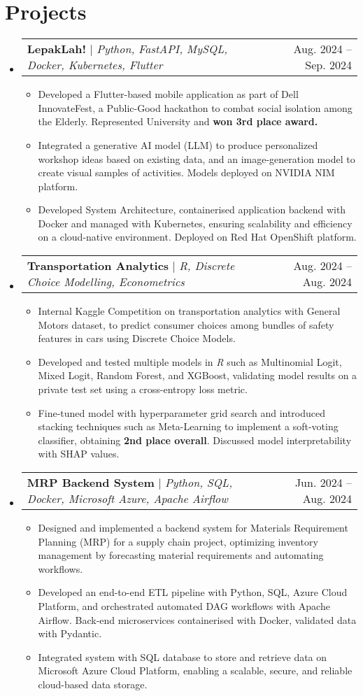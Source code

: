 \documentclass[letterpaper,11pt]{article}
\makeatletter
\newcommand{\resumeItem}[1]{
  \item\small{
    {#1 \vspace{-2pt}}
  }
}
\newcommand{\resumeProjectHeading}[2]{
    \item
    \begin{tabular*}{1.001\textwidth}{l@{\extracolsep{\fill}}r}
      \small#1 & \small #2\\
    \end{tabular*}\vspace{-7pt}
}
\newcommand{\resumeSubHeadingListStart}{\begin{itemize}[leftmargin=0.0in, label={}]}
\newcommand{\resumeSubHeadingListEnd}{\end{itemize}}
\newcommand{\resumeItemListStart}{\begin{itemize}}
\newcommand{\resumeItemListEnd}{\end{itemize}\vspace{-5pt}}
\makeatother
\begin{document}
\section{Projects}
    \vspace{-5pt}
    \resumeSubHeadingListStart
      \resumeProjectHeading
          {\textbf{LepakLah!} $|$ \emph{Python, FastAPI, MySQL, Docker, Kubernetes, Flutter}}{Aug. 2024 -- Sep. 2024}
          \resumeItemListStart
            \resumeItem{Developed a Flutter-based mobile application as part of Dell InnovateFest, a Public-Good hackathon to combat social isolation among the Elderly. Represented University and \textbf{won 3rd place award.}}
            \resumeItem{Integrated a generative AI model (LLM) to produce personalized workshop ideas based on existing data, and an image-generation model to create visual samples of activities. Models deployed on NVIDIA NIM platform.}
            \resumeItem{Developed System Architecture, containerised application backend with Docker and managed with Kubernetes, ensuring scalability and efficiency on a cloud-native environment. Deployed on Red Hat OpenShift platform.}
          \resumeItemListEnd
    \vspace{-12pt}
      \resumeProjectHeading
          {\textbf{Transportation Analytics} $|$ \emph{R, Discrete Choice Modelling, Econometrics}}{Aug. 2024 -- Aug. 2024}
          \resumeItemListStart
            \resumeItem{Internal Kaggle Competition on transportation analytics with General Motors dataset, to predict consumer choices among bundles of safety features in cars using Discrete Choice Models.}
            \resumeItem{Developed and tested multiple models in \emph{R} such as Multinomial Logit, Mixed Logit, Random Forest, and XGBoost, validating model results on a private test set using a cross-entropy loss metric.}
            \resumeItem{Fine-tuned model with hyperparameter grid search and introduced stacking techniques such as Meta-Learning to implement a soft-voting classifier, obtaining \textbf{2nd place overall}. Discussed model interpretability with SHAP values.}
          \resumeItemListEnd
    \vspace{-12pt}
      \resumeProjectHeading
          {\textbf{MRP Backend System} $|$ \emph{Python, SQL, Docker, Microsoft Azure, Apache Airflow}}{Jun. 2024 -- Aug. 2024}
          \resumeItemListStart
            \resumeItem{Designed and implemented a backend system for Materials Requirement Planning (MRP) for a supply chain project, optimizing inventory management by forecasting material requirements and automating workflows.}
            \resumeItem{Developed an end-to-end ETL pipeline with Python, SQL, Azure Cloud Platform, and orchestrated automated DAG workflows with Apache Airflow. Back-end microservices containerised with Docker, validated data with Pydantic.}
            \resumeItem{Integrated system with SQL database to store and retrieve data on Microsoft Azure Cloud Platform, enabling a scalable, secure, and reliable cloud-based data storage.}
          \resumeItemListEnd
    \resumeSubHeadingListEnd
\end{document}
